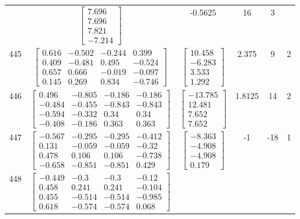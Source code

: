 \documentclass[a4paper,12pt]{article}
\begin{document}
\begin{tabular}{c c c c c c}
&
$\begin{bmatrix} 7.696 \\ 7.696 \\ 7.821 \\ -7.214 \end{bmatrix}$
&
-0.5625
&
16
&
3
\\
445
&
$\begin{bmatrix} 0.616 & -0.502 & -0.244 & 0.399 \\ 0.409 & -0.481 & 0.495 & -0.524 \\ 0.657 & 0.666 & -0.019 & -0.097 \\ 0.145 & 0.269 & 0.834 & -0.746 \end{bmatrix}$
&
$\begin{bmatrix} 10.458 \\ -6.283 \\ 3.533 \\ 1.292 \end{bmatrix}$
&
2.375
&
9
&
2
\\
446
&
$\begin{bmatrix} 0.496 & -0.805 & -0.186 & -0.186 \\ -0.484 & -0.455 & -0.843 & -0.843 \\ -0.594 & -0.332 & 0.34 & 0.34 \\ -0.408 & -0.186 & 0.363 & 0.363 \end{bmatrix}$
&
$\begin{bmatrix} -13.785 \\ 12.481 \\ 7.652 \\ 7.652 \end{bmatrix}$
&
1.8125
&
14
&
2
\\
447
&
$\begin{bmatrix} -0.567 & -0.295 & -0.295 & -0.412 \\ 0.131 & -0.059 & -0.059 & -0.32 \\ 0.478 & 0.106 & 0.106 & -0.738 \\ -0.658 & -0.851 & -0.851 & 0.429 \end{bmatrix}$
&
$\begin{bmatrix} -8.363 \\ -4.908 \\ -4.908 \\ 0.179 \end{bmatrix}$
&
-1
&
-18
&
1
\\
448
&
$\begin{bmatrix} -0.449 & -0.3 & -0.3 & -0.12 \\ 0.458 & 0.241 & 0.241 & -0.104 \\ 0.455 & -0.514 & -0.514 & -0.985 \\ 0.618 & -0.574 & -0.574 & 0.068 \end{bmatrix}$

\end{tabular}
\end{document}
